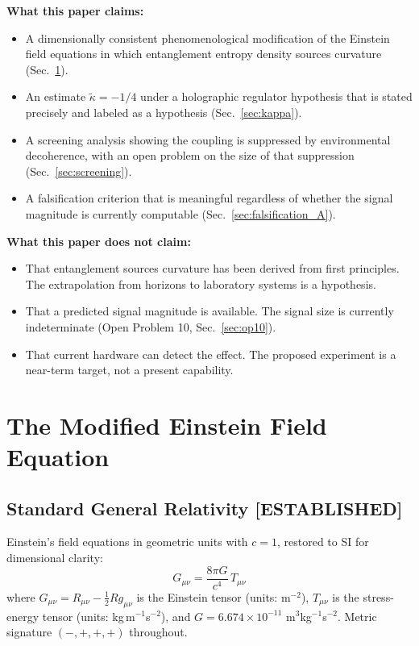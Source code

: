 \documentclass[12pt,letterpaper]{article}
\theoremstyle{plain}
\theoremstyle{definition}
\theoremstyle{remark}
\begin{document}
\textbf{What this paper claims:}
\begin{itemize}
  \item A dimensionally consistent phenomenological modification of the
    Einstein field equations in which entanglement entropy density sources
    curvature (Sec.~\ref{sec:field_eq}).
  \item An estimate $\tilde{\kappa} = -1/4$ under a holographic regulator
    hypothesis that is stated precisely and labeled as a hypothesis
    (Sec.~\ref{sec:kappa}).
  \item A screening analysis showing the coupling is suppressed by
    environmental decoherence, with an open problem on the size of that
    suppression (Sec.~\ref{sec:screening}).
  \item A falsification criterion that is meaningful regardless of whether
    the signal magnitude is currently computable (Sec.~\ref{sec:falsification_A}).
\end{itemize}

\textbf{What this paper does not claim:}
\begin{itemize}
  \item That entanglement sources curvature has been derived from
    first principles. The extrapolation from horizons to laboratory
    systems is a hypothesis.
  \item That a predicted signal magnitude is available. The signal size
    is currently indeterminate (Open Problem 10, Sec.~\ref{sec:op10}).
  \item That current hardware can detect the effect. The proposed
    experiment is a near-term target, not a present capability.
\end{itemize}

\section{The Modified Einstein Field Equation}
\label{sec:field_eq}

\subsection{Standard General Relativity \textcolor{blue!70!black}{[ESTABLISHED]}}

Einstein's field equations in geometric units with $c = 1$,
restored to SI for dimensional clarity:
\begin{equation}
  G_{\mu\nu} = \frac{8\pi G}{c^4}\,T_{\mu\nu}
  \tag{A1.1}
  \label{eq:EFE}
\end{equation}
where $G_{\mu\nu} = R_{\mu\nu} - \tfrac{1}{2}Rg_{\mu\nu}$ is the
Einstein tensor (units: m$^{-2}$), $T_{\mu\nu}$ is the
stress-energy tensor (units: kg\,m$^{-1}$s$^{-2}$), and
$G = 6.674 \times 10^{-11}$ m$^3$kg$^{-1}$s$^{-2}$.
Metric signature $(-,+,+,+)$ throughout.
\end{document}
